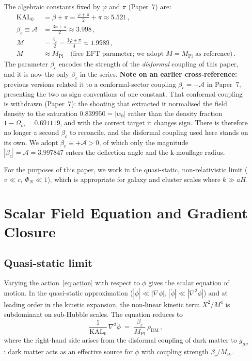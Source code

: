 \documentclass[12pt,a4paper]{article}
\newcommand{\phiG}{\varphi}
\newcommand{\KAL}{\mathrm{KAL}_0}
\newcommand{\MIRA}{\mathcal{M}}
\newcommand{\AURA}{\mathcal{A}}
\newcommand{\Mpl}{M_{\mathrm{Pl}}}
\newcommand{\Omm}{\Omega_{m}}
\newcommand{\bc}{\beta_c}
\begin{document}
The algebraic constants fixed by $\phiG$ and $\pi$ (Paper~7) are:
\begin{align}
  \KAL    &= \beta + \pi = \frac{\phiG+\pi}{2} + \pi \approx 5.521\,,
              \label{eq:KAL}\\
  \bc \equiv \AURA &= \frac{3\phiG+\pi}{2} \approx 3.998\,,
              \label{eq:bc}\\
  \MIRA   &= \frac{\bc}{2} = \frac{3\phiG+\pi}{4} \approx 1.9989\,,
              \label{eq:MIRA}\\
  M       &\approx \Mpl\quad\text{(free EFT parameter; we adopt $M=\Mpl$ as reference)}\,.
              \label{eq:M}
\end{align}
The parameter $\bc$ encodes the strength of the \emph{disformal} coupling of
this paper, and it is now the only $\bc$ in the series.
\textbf{Note on an earlier cross-reference:} previous versions related it to a
conformal-sector coupling $\bc = -\AURA$ in Paper~7, presenting the two as
sign conventions of one constant.  That conformal coupling is withdrawn
(Paper~7): the shooting that extracted it normalised the field density to the
saturation $0.839950 = |w_0|$ rather than the density fraction
$1-\Omm = 0.691119$, and with the correct target it changes sign.  There is
therefore no longer a second $\bc$ to reconcile, and the disformal coupling
used here stands on its own.  We adopt $\bc \equiv +\AURA > 0$, of which only
the magnitude $|\bc| = \AURA = 3.997847$ enters the deflection angle and the
k-mouflage radius.

For the purposes of this paper, we work in the quasi-static, non-relativistic
limit ($v \ll c$, $\Phi_N \ll 1$), which is appropriate for galaxy and
cluster scales where $k \gg aH$.

\section{Scalar Field Equation and Gradient Closure}
\label{sec:eom}

\subsection{Quasi-static limit}

Varying the action~\eqref{eq:action} with respect to $\phi$ gives the
scalar equation of motion.
In the quasi-static approximation
($|\dot\phi| \ll |\nabla\phi|$, $|\ddot\phi| \ll |\nabla^2\phi|$)
and at leading order in the kinetic expansion, the non-linear kinetic
term $X^2/M^4$ is subdominant on sub-Hubble scales.
The equation reduces to
\begin{equation}
  \frac{1}{\KAL}\,\nabla^2\phi \;=\; \frac{\bc}{\Mpl}\,\rho_{\mathrm{DM}}\,,
  \label{eq:phi_eom}
\end{equation}
where the right-hand side arises from the disformal coupling of dark matter
to $\tilde{g}_{\mu\nu}$: dark matter acts as an effective source for $\phi$
with coupling strength $\bc/\Mpl$.
\end{document}
